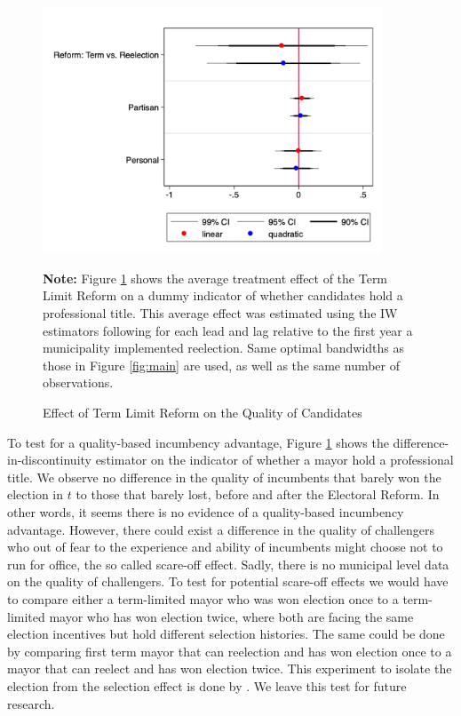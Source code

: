 \documentclass[12pt]{amsart}
\numberwithin{equation}{section}
\theoremstyle{definition}
\theoremstyle{definition}
\theoremstyle{definition}
\begin{document}
 \begin{figure}[H]   
\centering
 \caption{Effect of Term Limit Reform on the Quality of Candidates}
 \label{fig:quality_trend}
\includegraphics[width=0.9\textwidth]{Figures_incumbency/quality.png}
       \captionsetup{justification=centering}
         
 \textbf{Note:} Figure \ref{fig:quality_trend} shows the average treatment effect of the Term Limit Reform on a dummy indicator of whether candidates hold a professional title. This average effect was estimated using the IW estimators following \citet{abraham_sun_2020} for each lead and lag relative to the first year a municipality implemented reelection. Same optimal bandwidths as those in Figure \ref{fig:main} are used, as well as the same number of observations.   
     
\end{figure}   

To test for a quality-based incumbency advantage, Figure \ref{fig:quality_trend} shows the difference-in-discontinuity estimator on the indicator of whether a mayor hold a professional title. We observe no difference in the quality of incumbents that barely won the election in $t$ to those that barely lost, before and after the Electoral Reform. In other words, it seems there is no evidence of a quality-based incumbency advantage. However, there could exist a difference in the quality of challengers who out of fear to the experience and ability of incumbents might choose not to run for office, the so called scare-off effect. Sadly, there is no municipal level data on the quality of challengers. To test for potential scare-off effects we would have to compare either a term-limited mayor who was won election once to a term-limited mayor who has won election twice, where both are facing the same election incentives but hold different selection histories. The same could be done by comparing first term mayor that can reelection and has won election once to a mayor that can reelect and has won election twice. This experiment to isolate the election from the selection effect is done by \citet{ashworth_2012}. We leave this test for future research.
\end{document}
